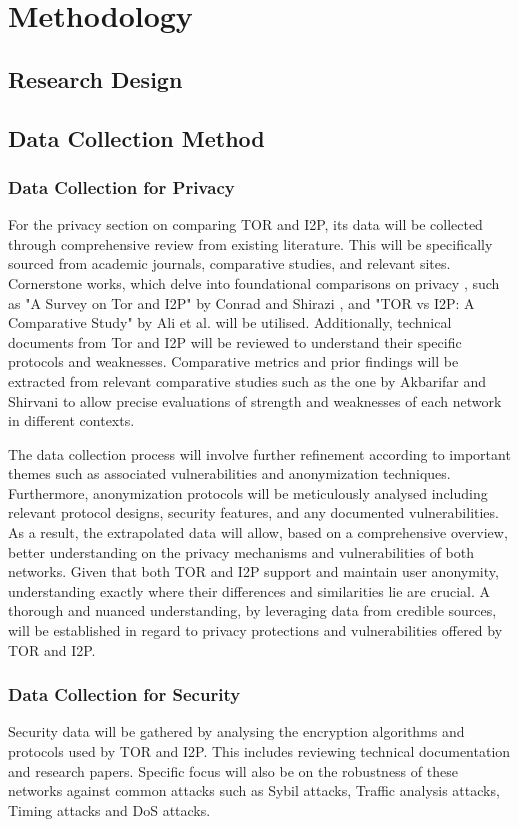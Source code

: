 \documentclass[12pt,conference]{IEEEtran}
\begin{document}
\section{Methodology}
\subsection{Research Design}
\subsection{Data Collection Method}
\subsubsection{Data Collection for Privacy}
For the privacy section on comparing TOR and I2P, its data will be collected through comprehensive review from existing literature. This will be specifically sourced from academic journals, comparative studies, and relevant sites. Cornerstone works, which delve into foundational comparisons on privacy , such as "A Survey on Tor and I2P" by Conrad and Shirazi \cite{aSurveyOnTORAndI2P}, and "TOR vs I2P: A Comparative Study" by Ali et al. \cite{TORVsI2P} will be utilised. Additionally, technical documents from Tor and I2P will be reviewed to understand their specific protocols and weaknesses. Comparative metrics and prior findings will be extracted from relevant comparative studies such as the one by Akbarifar and Shirvani \cite{aComparativeStudyOnAnonymizingNetworks} to allow precise evaluations of strength and weaknesses of each network in different contexts. 

The data collection process will involve further refinement according to important themes such as associated vulnerabilities and anonymization techniques. Furthermore, anonymization protocols will be meticulously analysed including relevant protocol designs, security features, and any documented vulnerabilities. As a result, the extrapolated data will allow, based on a comprehensive overview, better understanding on the privacy mechanisms and vulnerabilities of both networks. Given that both TOR and I2P support and maintain user anonymity, understanding exactly where their differences and similarities lie are crucial. A thorough and nuanced understanding, by leveraging data from credible sources, will be established in regard to privacy protections and vulnerabilities offered by TOR and I2P. 
\subsubsection{Data Collection for Security}
Security data will be gathered by analysing the encryption algorithms and protocols used by TOR and I2P. This includes reviewing technical documentation and research papers. Specific focus will also be on the robustness of these networks against common attacks such as Sybil attacks, Traffic analysis attacks, Timing attacks and DoS attacks.
\end{document}
